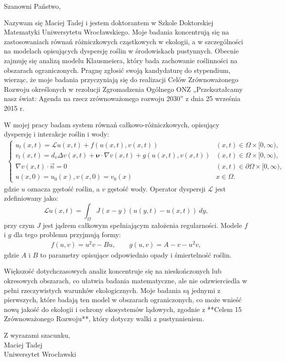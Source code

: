 \documentclass[a4paper,12pt]{letter}
\begin{document}
\begin{letter}{}

\opening{Szanowni Państwo,}

Nazywam się Maciej Tadej i jestem doktorantem w Szkole Doktorskiej Matematyki Uniwersytetu Wrocławskiego. Moje badania koncentrują się na zastosowaniach równań różniczkowych cząstkowych w ekologii, a w szczególności na modelach opisujących dyspersję roślin w środowiskach pustynnych. Obecnie zajmuję się analizą modelu Klausmeiera, który bada zachowanie roślinności na obszarach ograniczonych. Pragnę zgłosić swoją kandydaturę do stypendium, wierząc, że moje badania przyczyniają się do realizacji Celów Zrównoważonego Rozwoju określonych w rezolucji Zgromadzenia Ogólnego ONZ „Przekształcamy nasz świat: Agenda na rzecz zrównoważonego rozwoju 2030” z dnia 25 września 2015 r.

W mojej pracy badam system równań całkowo-różniczkowych, opisujący dyspersję i interakcje roślin i wody:
\begin{align}
    \begin{cases}
        u_t(x,t) = \mathcal{L} u(x, t) + f(u(x,t), v(x,t)) &(x, t) \in \Omega \times [0, \infty), \\
        v_t(x,t) = d_v\Delta v(x,t) + \mathbf{\nu} \cdot \nabla v(x,t) + g(u(x,t), v(x,t)) &(x, t) \in \Omega \times [0, \infty), \\
        \nabla v(x,t) \cdot \overrightarrow{n} = 0 &(x, t) \in \partial\Omega \times [0, \infty), \\
        u(x,0) = u_0(x), v(x,0) = v_0(x) &x \in \Omega.
    \end{cases}
\end{align}
gdzie $u$ oznacza gęstość roślin, a $v$ gęstość wody. Operator dyspersji $\mathcal{L}$ jest zdefiniowany jako:
\begin{equation}
    \mathcal{L}u(x, t) = \int_\Omega J(x-y)\left(u(y, t) - u(x, t)\right)\:dy,
\end{equation}
przy czym $J$ jest jądrem całkowym spełniającym założenia regularności. Modele $f$ i $g$ dla tego problemu przyjmują formy:
\begin{align*}
    f(u, v) = u^2 v - B u, \quad\quad g(u, v) = A - v - u^2 v,
\end{align*}
gdzie $A$ i $B$ to parametry opisujące odpowiednio opady i śmiertelność roślin.

Większość dotychczasowych analiz koncentruje się na nieskończonych lub okresowych obszarach, co ułatwia badania matematyczne, ale nie odzwierciedla w pełni rzeczywistych warunków ekologicznych. Moje badania są jednymi z pierwszych, które badają ten model w obszarach ograniczonych, co może wnieść nową jakość do ekologii i ochrony ekosystemów lądowych, zgodnie z **Celem 15 Zrównoważonego Rozwoju**, który dotyczy walki z pustynnieniem.

Z wyrazami szacunku,\\[2ex]
Maciej Tadej\\
Uniwersytet Wrocławski

\end{letter}
\end{document}
